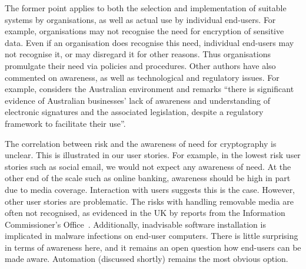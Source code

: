 \documentclass{article}
\def\citeN{\citet}
\def\cite{\citep}
\begin{document}
The former point applies to both the selection and implementation of
suitable systems by organisations, as well as actual use by individual
end-users.  For example, organisations may not recognise the need for
encryption of sensitive data.  Even if an organisation does recognise
this need, individual end-users may not recognise it, or may disregard it for other
reasons.  Thus organisations promulgate their need via policies and
procedures.  Other authors have also commented on awareness, as well
as technological and regulatory issues.  For example,
\citeN{Srivastava09} considers the Australian environment and remarks
``there is significant evidence of Australian businesses' lack of
awareness and understanding of electronic signatures and the
associated legislation, despite a regulatory framework to facilitate
their use''.

The correlation between risk and the awareness of need for
cryptography is unclear.  This is illustrated in our user
stories.  For example, in the lowest risk user stories such as
social email, we would not expect any awareness of need.  At the
other end of the scale such as online banking, awareness should be
high in part due to media coverage.  Interaction with users suggests
this is the case.  However, other user stories are problematic.  The
risks with handling removable media are often not recognised, as
evidenced in the UK by reports from the Information Commissioner's
Office~\cite{mICO}.  Additionally, inadvisable software installation
is implicated in malware infections on end-user computers.  There is
little surprising in terms of awareness here, and it remains an open
question how end-users can be made aware.
Automation (discussed shortly) remains the most obvious option.
\end{document}
